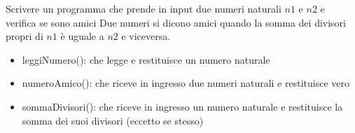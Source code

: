 \begin{Exercise}[label={ex:amici}]
    Scrivere un programma che prende in input due numeri naturali $n1$ e $n2$ e verifica se sono amici
    Due numeri si dicono amici quando la somma dei divisori propri di $n1$ è uguale a $n2$ e viceversa.
    \begin{itemize}
        \item leggiNumero(): che legge e restituisce un numero naturale
        \item numeroAmico(): che riceve in ingresso due numeri naturali e restituisce vero
        \item sommaDivisori(): che riceve in ingresso un numero naturale e restituisce la somma dei suoi divisori (eccetto se stesso)
    \end{itemize}
\end{Exercise}

\begin{Answer}[ref={ex:amici}]
  	
\end{Answer}
